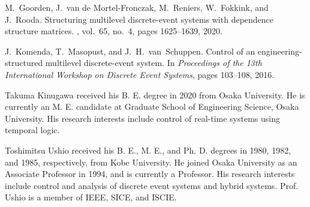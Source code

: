 \documentclass{article}
\begin{document}
\begin{thebibliography}{99}
%
M.~{Goorden}, J.~van de Mortel-Fronczak, M.~{Reniers}, W.~{Fokkink}, and J.~{Rooda}.
\newblock Structuring multilevel discrete-event systems with dependence structure matrices.
, vol.~65, no.~4, pages 1625--1639, 2020.

%
J.~{Komenda}, T.~{Masopust}, and J.~H.~van~Schuppen.
\newblock Control of an engineering-structured multilevel discrete-event system.
\newblock In {\em Proceedings of the 13th International Workshop on Discrete Event Systems}, pages 103--108, 2016.

\end{thebibliography}

\begin{IEEEbiographynophoto}{Takuma Kinugawa}
received his B. E. degree in 2020 from Osaka University. He is currently an M. E. candidate at Graduate School of Engineering Science, Osaka University. His research interests include control of real-time systems using temporal logic.
\end{IEEEbiographynophoto}
%
\begin{IEEEbiographynophoto}{Toshimitsu Ushio}
received his B. E., M. E., and Ph. D. degrees in 1980, 1982, and 1985, respectively,
from Kobe University.  He joined Osaka University as an Associate Professor in 1994, and is currently a Professor. His research interests include control and analysis of discrete event systems and hybrid systems.  Prof. Ushio is a member of IEEE, SICE, and ISCIE.
\end{IEEEbiographynophoto}
%
\end{document}
